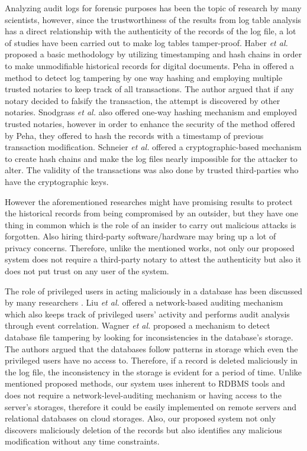 Analyzing audit logs for forensic purposes has been the topic of research by many scientists, however, since the trustworthiness of the results from log table analysis has a direct relationship with the authenticity of the records of the log file, a lot of studies have been carried out to make log tables tamper-proof. Haber {\it et al.}\cite{haber1991how} proposed a basic methodology by utilizing timestamping and hash chains in order to make unmodifiable historical records for digital documents. Peha in \cite{peha1999electronic} offered a method to detect log tampering by one way hashing and employing multiple trusted notaries to keep track of all transactions. The author argued that if any notary decided to falsify the transaction, the attempt is discovered by other notaries. Snodgrass {\it et al.} \cite{snodgrass2004Tamper} also offered one-way hashing mechanism and employed trusted notaries, however in order to enhance the security of the method offered by Peha, they offered to hash the records with a timestamp of previous transaction modification. Schneier {\it et al.}\cite{schneier1998cryptoraphic} offered a cryptographic-based mechanism to create hash chains and make the log files nearly impossible for the attacker to alter. The validity of the transactions was also done by trusted third-parties who have the cryptographic keys.

However the aforementioned researches might have promising results to protect the historical records from being compromised by an outsider, but they have one thing in common which is the role of an insider to carry out malicious attacks is forgotten. Also hiring third-party software/hardware may bring up a lot of privacy concerns. Therefore, unlike the mentioned works, not only our proposed system does not require a third-party notary to attest the authenticity but also it does not put trust on any user of the system.

The role of privileged users in acting maliciously in a database has been discussed by many researchers \cite{crosby2009tamper-evident} \cite{wagner2018detect}. Liu {\it et al.} offered a network-based auditing mechanism which also keeps track of privileged users' activity and performs audit analysis through event correlation. Wagner {\it et al.} \cite{wanger2017carving} proposed a mechanism to detect database file tampering by looking for inconsistencies in the database's storage. The authors argued that the databases follow patterns in storage which even the privileged users have no access to. Therefore, if a record is deleted maliciously in the log file, the inconsistency in the storage is evident for a period of time. Unlike mentioned proposed methods, our system uses inherent to RDBMS tools and does not require a network-level-auditing mechanism or having access to the server's storages, therefore it could be easily implemented on remote servers and relational databases on cloud storages. Also, our proposed system not only discovers maliciously deletion of the records but also identifies any malicious modification without any time constraints.

